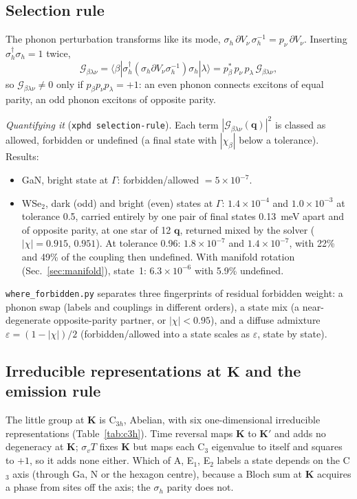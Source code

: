 \documentclass[10pt,a4paper]{article}
\newcommand{\G}{\mathcal{G}}
\newcommand{\bq}{\mathbf{q}}
\newcommand{\bK}{\mathbf{K}}
\begin{document}
\subsection{Selection rule}
The phonon perturbation transforms like its mode,
$\sigma_h\,\partial V_\nu\,\sigma_h^{-1}=p_\nu\,\partial V_\nu$. Inserting
$\sigma_h^\dagger\sigma_h=1$ twice,
\begin{equation}
\G_{\beta\lambda\nu}=\langle\beta|\sigma_h^\dagger(\sigma_h\partial V_\nu\sigma_h^{-1})\sigma_h|\lambda\rangle
=p_\beta^{*}\,p_\nu\,p_\lambda\,\G_{\beta\lambda\nu},
\end{equation}
so $\G_{\beta\lambda\nu}\neq0$ only if $p_\beta p_\nu p_\lambda=+1$: an even
phonon connects excitons of equal parity, an odd phonon excitons of opposite
parity.

\emph{Quantifying it} (\texttt{xphd selection-rule}). Each term
$|\G_{\beta\lambda\nu}(\bq)|^2$ is classed as allowed, forbidden or undefined
(a final state with $|\chi_\beta|$ below a tolerance). Results:
\begin{itemize}[nosep,leftmargin=1.2em]
\item GaN, bright state at $\Gamma$: forbidden/allowed $=5\times10^{-7}$.
\item WSe$_2$, dark (odd) and bright (even) states at $\Gamma$: $1.4\times10^{-4}$
and $1.0\times10^{-3}$ at tolerance 0.5, carried entirely by one pair of final
states 0.13~meV apart and of opposite parity, at one star of 12 $\bq$, returned
mixed by the solver ($|\chi|=0.915$, $0.951$). At tolerance 0.96:
$1.8\times10^{-7}$ and $1.4\times10^{-7}$, with 22\% and 49\% of the coupling then
undefined. With manifold rotation (Sec.~\ref{sec:manifold}), state~1:
$6.3\times10^{-6}$ with 5.9\% undefined.
\end{itemize}
\texttt{where\_forbidden.py} separates three fingerprints of residual forbidden
weight: a phonon swap (labels and couplings in different orders), a state mix (a
near-degenerate opposite-parity partner, or $|\chi|<0.95$), and a diffuse
admixture $\varepsilon=(1-|\chi|)/2$ (forbidden/allowed into a state scales as
$\varepsilon$, state by state).

\subsection{Irreducible representations at $\mathbf{K}$ and the emission rule}
The little group at $\bK$ is C$_{3h}$, Abelian, with six one-dimensional
irreducible representations (Table~\ref{tab:c3h}). Time reversal maps $\bK$ to
$\bK'$ and adds no degeneracy at $\bK$; $\sigma_vT$ fixes $\bK$ but maps each
C$_3$ eigenvalue to itself and squares to $+1$, so it adds none either. Which of
A, E$_1$, E$_2$ labels a state depends on the C$_3$ axis (through Ga, N or the
hexagon centre), because a Bloch sum at $\bK$ acquires a phase from sites off
the axis; the $\sigma_h$ parity does not.
\end{document}
